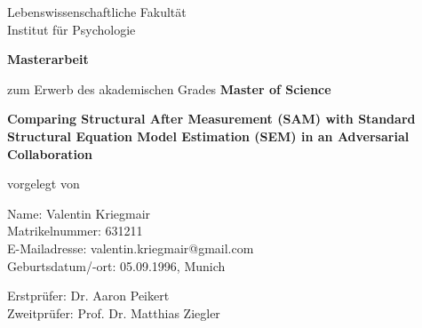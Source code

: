 \documentclass[11pt, a4paper]{article}
\begin{document}
\thispagestyle{empty} 



\vspace{4.5cm}
\raggedright
{\large Lebenswissenschaftliche Fakultät}\\
Institut für Psychologie

\vspace{1.2cm}

\begin{center}
    \textbf{\Large Masterarbeit} \\

    \vspace{0.8cm}

    zum Erwerb des akademischen Grades \textbf{Master of Science}

    \vspace{1.5cm}

    \textbf{\large Comparing Structural After Measurement (SAM) with Standard Structural Equation Model Estimation (SEM) in an Adversarial Collaboration}
\end{center}

\vfill

\raggedright
vorgelegt von

\vspace{0.3cm}

Name: Valentin Kriegmair \\
Matrikelnummer: 631211 \\
E-Mailadresse: valentin.kriegmair@gmail.com \\
Geburtsdatum/-ort: 05.09.1996, Munich

\vspace{0.8cm}

Erstprüfer: Dr. Aaron Peikert \\
Zweitprüfer: Prof. Dr. Matthias Ziegler

\vspace{20mm}  %
\end{document}
